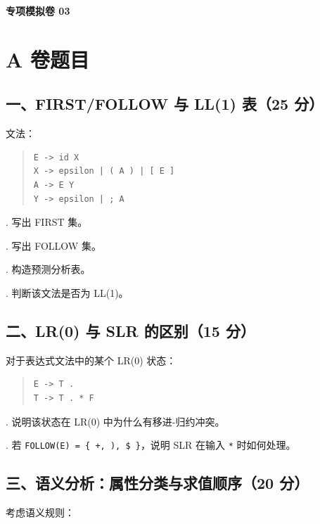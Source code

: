 \documentclass[UTF8,zihao=-4]{ctexart}
\begin{document}
\clearpage
\begin{center}
{\bfseries 专项模拟卷 03}
\end{center}

\section*{A 卷题目}

\subsection*{一、FIRST/FOLLOW 与 LL(1) 表（25 分）}

文法：

\begin{quote}
\footnotesize
\begin{verbatim}
E -> id X
X -> epsilon | ( A ) | [ E ]
A -> E Y
Y -> epsilon | ; A
\end{verbatim}
\end{quote}

. 写出 FIRST 集。\par
{}. 写出 FOLLOW 集。\par
{}. 构造预测分析表。\par
{}. 判断该文法是否为 LL(1)。\par

\subsection*{二、LR(0) 与 SLR 的区别（15 分）}

对于表达式文法中的某个 LR(0) 状态：

\begin{quote}
\footnotesize
\begin{verbatim}
E -> T .
T -> T . * F
\end{verbatim}
\end{quote}

. 说明该状态在 LR(0) 中为什么有移进-归约冲突。\par
{}. 若 \texttt{FOLLOW(E) = \{ +, ), \$ \}}，说明 SLR 在输入 \texttt{*} 时如何处理。\par

\subsection*{三、语义分析：属性分类与求值顺序（20 分）}

考虑语义规则：
\end{document}
